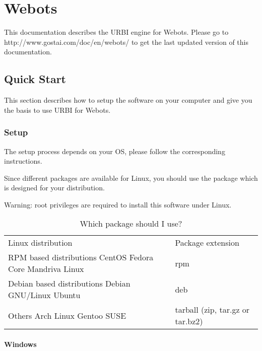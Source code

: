 \chapter{Webots}
\label{sec:webots}


This documentation describes the URBI engine for Webots.  Please go to
http://www.gostai.com/doc/en/webots/ to get the last updated version
of this documentation.



\section{Quick Start}
\label{webots.quickstart}%

This section describes how to setup the software on your computer and
give you the basis to use URBI for Webots.


\subsection{Setup}
\label{webots.setup}%

The setup process depends on your OS, please follow the corresponding
instructions.

Since different packages are available for Linux, you should use the
package which is designed for your distribution.

Warning: root privileges are required to install this software under
Linux.

\begin{table}[htbp]
\begin{center}
\begin{tabular}{ll}\hline
Linux distribution &    Package extension\\
RPM based distributions
CentOS
Fedora Core
Mandriva Linux &
rpm\\
Debian based distributions
Debian GNU/Linux
Ubuntu &
deb \\
Others
Arch Linux
Gentoo
SUSE &
tarball (zip, tar.gz or tar.bz2)\\
\hline
\end{tabular}

\end{center}

\caption{Which package should I use?}
\label{webots.setup.distributions}%
\end{table}

\subsubsection{Windows}
\label{webots.setup.windows}%

